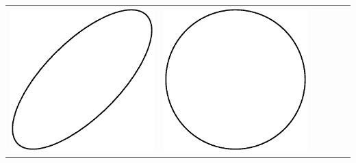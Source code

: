 \begin{center}
\begin{tabular}{c|ccccc}
\includegraphics[scale=0.2]{05_Oscilloscope/1-2.eps} &
\includegraphics[scale=0.2]{05_Oscilloscope/1-3.eps} &

\end{tabular}
\end{center}
